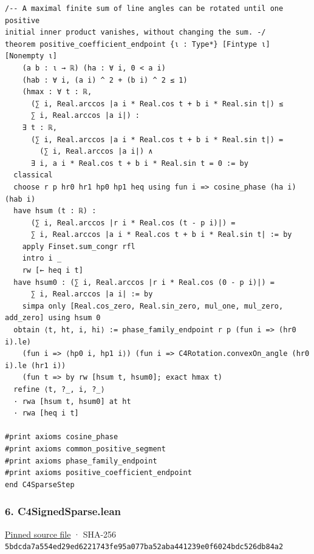 \documentclass[11pt,a4paper]{article}
\begin{document}
\begin{Verbatim}[breaklines,breakanywhere,fontsize=\footnotesize]
/-- A maximal finite sum of line angles can be rotated until one positive
initial inner product vanishes, without changing the sum. -/
theorem positive_coefficient_endpoint {ι : Type*} [Fintype ι] [Nonempty ι]
    (a b : ι → ℝ) (ha : ∀ i, 0 < a i)
    (hab : ∀ i, (a i) ^ 2 + (b i) ^ 2 ≤ 1)
    (hmax : ∀ t : ℝ,
      (∑ i, Real.arccos |a i * Real.cos t + b i * Real.sin t|) ≤
      ∑ i, Real.arccos |a i|) :
    ∃ t : ℝ,
      (∑ i, Real.arccos |a i * Real.cos t + b i * Real.sin t|) =
        (∑ i, Real.arccos |a i|) ∧
      ∃ i, a i * Real.cos t + b i * Real.sin t = 0 := by
  classical
  choose r p hr0 hr1 hp0 hp1 heq using fun i => cosine_phase (ha i) (hab i)
  have hsum (t : ℝ) :
      (∑ i, Real.arccos |r i * Real.cos (t - p i)|) =
      ∑ i, Real.arccos |a i * Real.cos t + b i * Real.sin t| := by
    apply Finset.sum_congr rfl
    intro i _
    rw [← heq i t]
  have hsum0 : (∑ i, Real.arccos |r i * Real.cos (0 - p i)|) =
      ∑ i, Real.arccos |a i| := by
    simpa only [Real.cos_zero, Real.sin_zero, mul_one, mul_zero, add_zero] using hsum 0
  obtain ⟨t, ht, i, hi⟩ := phase_family_endpoint r p (fun i => (hr0 i).le)
    (fun i => ⟨hp0 i, hp1 i⟩) (fun i => C4Rotation.convexOn_angle (hr0 i).le (hr1 i))
    (fun t => by rw [hsum t, hsum0]; exact hmax t)
  refine ⟨t, ?_, i, ?_⟩
  · rwa [hsum t, hsum0] at ht
  · rwa [heq i t]

#print axioms cosine_phase
#print axioms common_positive_segment
#print axioms phase_family_endpoint
#print axioms positive_coefficient_endpoint
end C4SparseStep
\end{Verbatim}

\subsubsection{6. C4SignedSparse.lean}\label{c4signedsparse.lean}

\href{https://github.com/mpelteshki/climbing-to-the-frontier/blob/29fbb70da18564048f62492e43870f2f96a65463/cagent/p1/C4SignedSparse.lean}{Pinned source file} · SHA-256 \texttt{5bdcda7a\allowbreak{}554ed29e\allowbreak{}d6221743\allowbreak{}fe95a077\allowbreak{}ba52aba4\allowbreak{}41239e0f\allowbreak{}6024bdc5\allowbreak{}26db84a2}
\end{document}
